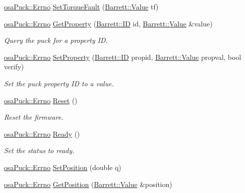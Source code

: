 \begin{DoxyCompactItemize}
\hyperlink{classosa_puck_af19c88d20083577d3a676353b4902391}{osa\-Puck\-::\-Errno} \hyperlink{classosa_puck_ad92b10c2520e7c1334819db2ed601279}{Set\-Torque\-Fault} (\hyperlink{struct_barrett_a57ff132885344ca62e4b4b691885685b}{Barrett\-::\-Value} tf)
\item 
\hyperlink{classosa_puck_af19c88d20083577d3a676353b4902391}{osa\-Puck\-::\-Errno} \hyperlink{classosa_puck_a565ea9b07a99c8474ef5edaf8231109a}{Get\-Property} (\hyperlink{struct_barrett_a317dfaed9982ffc28166e537d774bd16}{Barrett\-::\-I\-D} id, \hyperlink{struct_barrett_a57ff132885344ca62e4b4b691885685b}{Barrett\-::\-Value} \&value)
\begin{DoxyCompactList}\small\item\em Query the puck for a property I\-D. \end{DoxyCompactList}\item 
\hyperlink{classosa_puck_af19c88d20083577d3a676353b4902391}{osa\-Puck\-::\-Errno} \hyperlink{classosa_puck_a0fc97b9e3d7c17f4825339dc38ad36fc}{Set\-Property} (\hyperlink{struct_barrett_a317dfaed9982ffc28166e537d774bd16}{Barrett\-::\-I\-D} propid, \hyperlink{struct_barrett_a57ff132885344ca62e4b4b691885685b}{Barrett\-::\-Value} propval, bool verify)
\begin{DoxyCompactList}\small\item\em Set the puck property I\-D to a value. \end{DoxyCompactList}\item 
\hyperlink{classosa_puck_af19c88d20083577d3a676353b4902391}{osa\-Puck\-::\-Errno} \hyperlink{classosa_puck_a2722885c5061ff2e2df5bb7561bf2e58}{Reset} ()
\begin{DoxyCompactList}\small\item\em Reset the firmware. \end{DoxyCompactList}\item 
\hyperlink{classosa_puck_af19c88d20083577d3a676353b4902391}{osa\-Puck\-::\-Errno} \hyperlink{classosa_puck_a29e797d17705c22ae9a5fcb4bd5f5893}{Ready} ()
\begin{DoxyCompactList}\small\item\em Set the status to ready. \end{DoxyCompactList}\item 
\hyperlink{classosa_puck_af19c88d20083577d3a676353b4902391}{osa\-Puck\-::\-Errno} \hyperlink{classosa_puck_a33d4b04d1ab8d833dd6b57b8132e8069}{Set\-Position} (double q)
\item 
\hyperlink{classosa_puck_af19c88d20083577d3a676353b4902391}{osa\-Puck\-::\-Errno} \hyperlink{classosa_puck_a4a94604727697e92f46712265a408989}{Get\-Position} (\hyperlink{struct_barrett_a57ff132885344ca62e4b4b691885685b}{Barrett\-::\-Value} \&position)

\end{DoxyCompactItemize}
